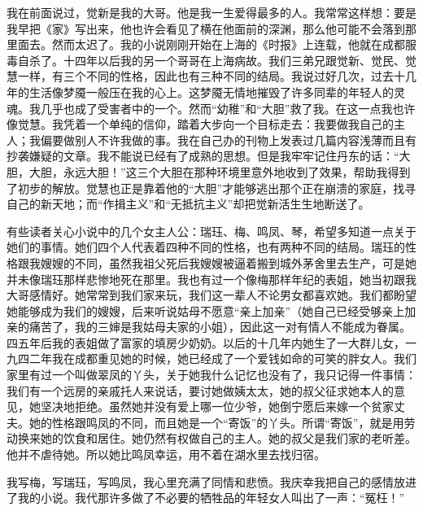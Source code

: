 \par 我在前面说过，觉新是我的大哥。他是我一生爱得最多的人。我常常这样想：要是我早把《家》写出来，他也许会看见了横在他面前的深渊，那么他可能不会落到那里面去。然而太迟了。我的小说刚刚开始在上海的《时报》上连载，他就在成都服毒自杀了。十四年以后我的另一个哥哥在上海病故。我们三弟兄跟觉新、觉民、觉慧一样，有三个不同的性格，因此也有三种不同的结局。我说过好几次，过去十几年的生活像梦魇一般压在我的心上。这梦魇无情地摧毁了许多同辈的年轻人的灵魂。我几乎也成了受害者中的一个。然而“幼稚”和“大胆”救了我。在这一点我也许像觉慧。我凭着一个单纯的信仰，踏着大步向一个目标走去：我要做我自己的主人；我偏要做别人不许我做的事。我在自己办的刊物上发表过几篇内容浅薄而且有抄袭嫌疑的文章。我不能说已经有了成熟的思想。但是我牢牢记住丹东的话：“大胆，大胆，永远大胆！”这三个大胆在那种环境里意外地收到了效果，帮助我得到了初步的解放。觉慧也正是靠着他的“大胆”才能够逃出那个正在崩溃的家庭，找寻自己的新天地；而“作揖主义”和“无抵抗主义”却把觉新活生生地断送了。
\par 有些读者关心小说中的几个女主人公：瑞珏、梅、鸣凤、琴，希望多知道一点关于她们的事情。她们四个人代表着四种不同的性格，也有两种不同的结局。瑞珏的性格跟我嫂嫂的不同，虽然我祖父死后我嫂嫂被逼着搬到城外茅舍里去生产，可是她并未像瑞珏那样悲惨地死在那里。我也有过一个像梅那样年纪的表姐，她当初跟我大哥感情好。她常常到我们家来玩，我们这一辈人不论男女都喜欢她。我们都盼望她能够成为我们的嫂嫂，后来听说姑母不愿意“亲上加亲”（她自己已经受够亲上加亲的痛苦了，我的三婶是我姑母夫家的小姐），因此这一对有情人不能成为眷属。四五年后我的表姐做了富家的填房少奶奶。以后的十几年内她生了一大群儿女，一九四二年我在成都重见她的时候，她已经成了一个爱钱如命的可笑的胖女人。我们家里有过一个叫做翠凤的丫头，关于她我什么记忆也没有了，我只记得一件事情：我们有一个远房的亲戚托人来说话，要讨她做姨太太，她的叔父征求她本人的意见，她坚决地拒绝。虽然她并没有爱上哪一位少爷，她倒宁愿后来嫁一个贫家丈夫。她的性格跟鸣凤的不同，而且她是一个“寄饭”的丫头。所谓“寄饭”，就是用劳动换来她的饮食和居住。她仍然有权做自己的主人。她的叔父是我们家的老听差。他并不虐待她。所以她比鸣凤幸运，用不着在湖水里去找归宿。
\par 我写梅，写瑞珏，写鸣凤，我心里充满了同情和悲愤。我庆幸我把自己的感情放进了我的小说。我代那许多做了不必要的牺牲品的年轻女人叫出了一声：“冤枉！”
